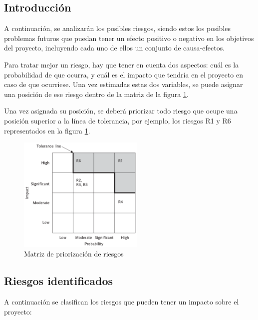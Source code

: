     \subsection{Introducción}
    
A continuación, se analizarán los posibles riesgos, siendo estos los posibles problemas futuros que puedan tener un efecto positivo o negativo en los objetivos del proyecto, incluyendo cada uno de ellos un conjunto de causa-efectos.

Para tratar mejor un riesgo, hay que tener en cuenta dos aspectos: cuál es la probabilidad de que ocurra, y cuál es el impacto que tendría en el proyecto en caso de que ocurriese.
Una vez estimadas estas dos variables, se puede asignar una posición de ese riesgo dentro de la matriz de la figura \ref{fig:riskmatrix}.

Una vez asignada su posición, se deberá priorizar todo riesgo que ocupe una posición superior a la línea de tolerancia, por ejemplo, los riesgos R1 y R6 representados en la figura \ref{fig:riskmatrix}.

\begin{figure}[h!]
    \centering
    \includegraphics[width=6cm]{./img/spm/riskmatrix.png}
    \caption{Matriz de priorización de riesgos}
    \label{fig:riskmatrix}
\end{figure}

\subsection{Riesgos identificados}

A continuación se clasifican los riesgos que pueden tener un impacto sobre el proyecto:


